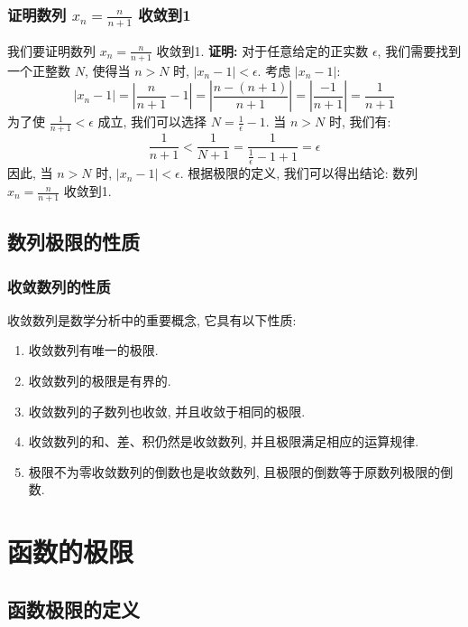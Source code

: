 \documentclass[
10pt, 
aspectratio=43, 
]{beamer}
\begin{document}
\begin{frame}
	\frametitle{证明数列 $x_n=\frac{n}{n+1}$ 收敛到1}
	我们要证明数列 $x_n=\frac{n}{n+1}$ 收敛到1. 
	\pause
	\textbf{证明: }
	对于任意给定的正实数 $\epsilon$, 我们需要找到一个正整数 $N$, 使得当 $n>N$ 时, $|x_n - 1| < \epsilon$. 
	\pause
	考虑 $|x_n - 1|$: 
	\[
		|x_n - 1| = \left|\frac{n}{n+1} - 1\right| = \left|\frac{n - (n+1)}{n+1}\right| = \left|\frac{-1}{n+1}\right| = \frac{1}{n+1}
	\]
	\pause
	为了使 $\frac{1}{n+1} < \epsilon$ 成立, 我们可以选择 $N = \frac{1}{\epsilon} - 1$. 
	\pause
	当 $n>N$ 时, 我们有: 
	\[
		\frac{1}{n+1} < \frac{1}{N+1} = \frac{1}{\frac{1}{\epsilon} - 1 + 1} = \epsilon
	\]
	\pause
	因此, 当 $n>N$ 时, $|x_n - 1| < \epsilon$. 
	\pause
	根据极限的定义, 我们可以得出结论: 数列 $x_n=\frac{n}{n+1}$ 收敛到1. 
\end{frame}

\subsection{数列极限的性质}

\begin{frame}
	\frametitle{收敛数列的性质}
	
	收敛数列是数学分析中的重要概念, 它具有以下性质: 
	
	\begin{enumerate}
		\item 收敛数列有唯一的极限. 
		      \pause
		\item 收敛数列的极限是有界的. 
		      \pause
		\item 收敛数列的子数列也收敛, 并且收敛于相同的极限. 
		      \pause
		\item 收敛数列的和、差、积仍然是收敛数列, 并且极限满足相应的运算规律. 
		      \pause
		\item 极限不为零收敛数列的倒数也是收敛数列, 且极限的倒数等于原数列极限的倒数. 
	\end{enumerate}
	
\end{frame}


\section{函数的极限}
\subsection{函数极限的定义}
\end{document}
